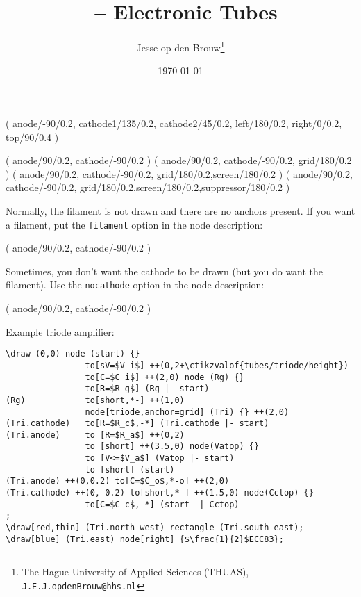 \documentclass[a4paper,titlepage]{article}
\author{Jesse op den Brouw\thanks{The Hague University of Applied Sciences (THUAS), \texttt{J.E.J.opdenBrouw@hhs.nl}}}
\title{\Circuitikz\ -- Electronic Tubes}
\date{\today}
\begin{document}
\begin{groupdesc}
    ( anode/-90/0.2, cathode1/135/0.2,
    cathode2/45/0.2, left/180/0.2, right/0/0.2, top/90/0.4 )
\end{groupdesc}

\begin{groupdesc}
	 ( anode/90/0.2, cathode/-90/0.2 )
	 ( anode/90/0.2, cathode/-90/0.2, grid/180/0.2 )
	 ( anode/90/0.2, cathode/-90/0.2, grid/180/0.2,screen/180/0.2 )
	 ( anode/90/0.2, cathode/-90/0.2, grid/180/0.2,screen/180/0.2,suppressor/180/0.2 )
\end{groupdesc}

Normally, the filament is not drawn and there are no anchors present. If you want a filament, put the \verb|filament| option in the node description:

\begin{groupdesc}
	 ( anode/90/0.2, cathode/-90/0.2 )
\end{groupdesc}

Sometimes, you don't want the cathode to be drawn (but you do want the filament). Use the \verb|nocathode| option in the node description:

\begin{groupdesc}
	 ( anode/90/0.2, cathode/-90/0.2 )
\end{groupdesc}

Example triode amplifier:

\begin{lstlisting}
\draw (0,0) node (start) {}
            	to[sV=$V_i$] ++(0,2+\ctikzvalof{tubes/triode/height})
            	to[C=$C_i$] ++(2,0) node (Rg) {}
				to[R=$R_g$] (Rg |- start)
(Rg)			to[short,*-] ++(1,0)
				node[triode,anchor=grid] (Tri) {} ++(2,0)
(Tri.cathode)	to[R=$R_c$,-*] (Tri.cathode |- start)
(Tri.anode)		to [R=$R_a$] ++(0,2)
				to [short] ++(3.5,0) node(Vatop) {}
				to [V<=$V_a$] (Vatop |- start)
				to [short] (start)
(Tri.anode) ++(0,0.2) to[C=$C_o$,*-o] ++(2,0)
(Tri.cathode) ++(0,-0.2) to[short,*-] ++(1.5,0) node(Cctop) {}
				to[C=$C_c$,-*] (start -| Cctop)
;
\draw[red,thin] (Tri.north west) rectangle (Tri.south east);
\draw[blue] (Tri.east) node[right] {$\frac{1}{2}$ECC83};
\end{lstlisting}
\end{document}
